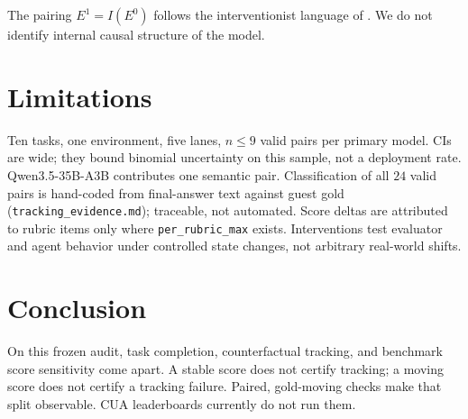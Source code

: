 \documentclass[11pt]{article}
\begin{document}
The pairing $E^1=I(E^0)$ follows the interventionist language of
\citet{pearl2009causality}. We do not identify internal causal
structure of the model.

\section{Limitations}

Ten tasks, one environment, five lanes, $n\le 9$ valid pairs per primary
model. CIs are wide; they bound binomial uncertainty on this sample,
not a deployment rate. Qwen3.5-35B-A3B contributes one semantic pair.
Classification of all $24$ valid pairs is hand-coded from final-answer
text against guest gold (\texttt{tracking\_evidence.md}); traceable, not
automated. Score deltas are attributed to rubric items only where
\texttt{per\_rubric\_max} exists. Interventions test evaluator and agent
behavior under controlled state changes, not arbitrary real-world
shifts.

\section{Conclusion}

On this frozen audit, task completion, counterfactual tracking, and
benchmark score sensitivity come apart. A stable score does not certify
tracking; a moving score does not certify a tracking failure. Paired,
gold-moving checks make that split observable. CUA leaderboards
currently do not run them.



\end{document}
